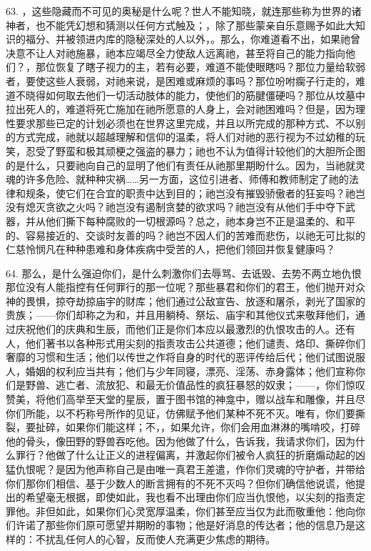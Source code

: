 63. ，这些隐藏而不可见的奥秘是什么呢？世人不能知晓，就连那些称为世界的诸神者，也不能凭幻想和猜测以任何方式触及；，除了那些蒙亲自乐意赐予如此大知识的福分、并被领进内库的隐秘深处的人以外，。那么，你难道看不出，如果祂曾决意不让人对祂施暴，祂本应竭尽全力使敌人远离祂，甚至将自己的能力指向他们？，那位恢复了瞎子视力的主，若有必要，难道不能使眼瞎吗？那位力量给软弱者，要使这些人衰弱，对祂来说，是困难或麻烦的事吗？那位吩咐瘸子行走的，难道不晓得如何取去他们一切活动肢体的能力，使他们的筋腱僵硬吗？那位从坟墓中拉出死人的，难道将死亡施加在祂所愿意的人身上，会对祂困难吗？但是，因为理性要求那些已定的计划必须也在世界这里完成，并且以所完成的那种方式、不以别的方式完成，祂就以超越理解和信仰的温柔，将人们对祂的恶行视为不过幼稚的玩笑，忍受了野蛮和极其顽梗之强盗的暴力；祂也不认为值得计较他们的大胆所企图的是什么，只要祂向自己的显明了他们有责任从祂那里期盼什么。因为，当祂就灵魂的许多危险、就种种灾祸……另一方面，这位引进者、师傅和教师制定了祂的法律和规条，使它们在合宜的职责中达到目的；祂岂没有摧毁骄傲者的狂妄吗？祂岂没有熄灭贪欲之火吗？祂岂没有遏制贪婪的欲求吗？祂岂没有从他们手中夺下武器，并从他们撕下每种腐败的一切根源吗？总之，祂本身岂不正是温柔的、和平的、容易接近的、交谈时友善的吗？祂岂不因人们的苦难而悲伤，以祂无可比拟的仁慈怜悯凡在种种患难和身体疾病中受苦的人，把他们领回并恢复健康吗？\par

64. 那么，是什么强迫你们，是什么刺激你们去辱骂、去诋毁、去势不两立地仇恨那位没有人能指控有任何罪行的那一位呢？那些暴君和你们的君王，他们抛开对众神的畏惧，掠夺劫掠庙宇的财库；他们通过公敌宣告、放逐和屠杀，剥光了国家的贵族；——你们却称之为和，并且用躺椅、祭坛、庙宇和其他仪式来敬拜他们，通过庆祝他们的庆典和生辰，而他们正是你们本应以最激烈的仇恨攻击的人。还有人，他们著书以各种形式用尖刻的指责攻击公共道德；他们谴责、烙印、撕碎你们奢靡的习惯和生活；他们以传世之作将自身的时代的恶评传给后代；他们试图说服人，婚姻的权利应当共有；他们与少年同寝，漂亮、淫荡、赤身露体；他们宣称你们是野兽、逃亡者、流放犯、和最无价值品性的疯狂暴怒的奴隶；——，你们惊叹赞美，将他们高举至天堂的星辰，置于图书馆的神龛中，赠以战车和雕像，并且尽你们所能，以不朽称号所作的见证，仿佛赋予他们某种不死不灭。唯有，你们要撕裂，要扯碎，如果你们能这样；不，，如果允许，你们会用血淋淋的嘴啃咬，打碎他的骨头，像田野的野兽吞吃他。因为他做了什么，告诉我，我请求你们，因为什么罪行？他做了什么让正义的进程偏离，并激起你们被令人疯狂的折磨煽动起的凶猛仇恨呢？是因为他声称自己是由唯一真君王差遣，作你们灵魂的守护者，并带给你们那你们相信、基于少数人的断言拥有的不死不灭吗？但你们确信他说谎，他提出的希望毫无根据，即使如此，我也看不出理由你们应当仇恨他，以尖刻的指责定罪他。非但如此，如果你们心灵宽厚温柔，你们甚至应当仅为此而敬重他：他向你们许诺了那些你们原可愿望并期盼的事物；他是好消息的传达者；他的信息乃是这样的：不扰乱任何人的心智，反而使人充满更少焦虑的期待。\par

